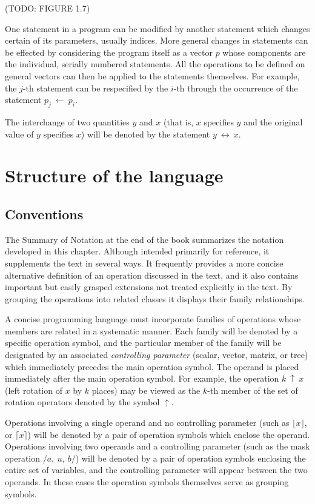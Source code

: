 \par (TODO: FIGURE 1.7)

\par One statement in a program can be modified by another statement which changes certain of its parameters, usually indices. More general changes in statements can be effected by considering the program itself as a vector $p$ whose components are the individual, serially numbered statements. All the operations to be defined on general vectors can then be applied to the statements themselves. For example, the $j$-th statement can be respecified by the $i$-th through the occurrence of the statement $p_j\ ←\ p_i$.

\par The interchange of two quantities $y$ and $x$ (that is, $x$ specifies $y$ and the original value of $y$ specifies $x$) will be denoted by the statement $y\ \leftrightarrow\ x$.

\section{Structure of the language}

\subsection*{Conventions}

\par The Summary of Notation at the end of the book summarizes the notation developed in this chapter. Although intended primarily for reference, it supplements the text in several ways. It frequently provides a more concise alternative definition of an operation discussed in the text, and it also contains important but easily grasped extensions not treated explicitly in the text. By grouping the operations into related classes it displays their family relationships.

\par A concise programming language must incorporate families of operations whose members are related in a systematic manner. Each family will be denoted by a specific operation symbol, and the particular member of the family will be designated by an associated \textit{controlling parameter} (scalar, vector, matrix, or tree) which immediately precedes the main operation symbol. The operand is placed immediately after the main operation symbol. For example, the operation $k\ ↑\ x$ (left rotation of $x$ by $k$ places) may be viewed as the $k$-th member of the set of rotation operators denoted by the symbol $↑$.

\par Operations involving a single operand and no controlling parameter (such as $\lfloor x \rfloor$, or $\lceil x \rceil$) will be denoted by a pair of operation symbols which enclose the operand. Operations involving two operands and a controlling parameter (such as the mask operation $/a,\ u,\ b/$) will be denoted by a pair of operation symbols enclosing the entire set of variables, and the controlling parameter will appear between the two operands. In these cases the operation symbols themselves serve as grouping symbols.
